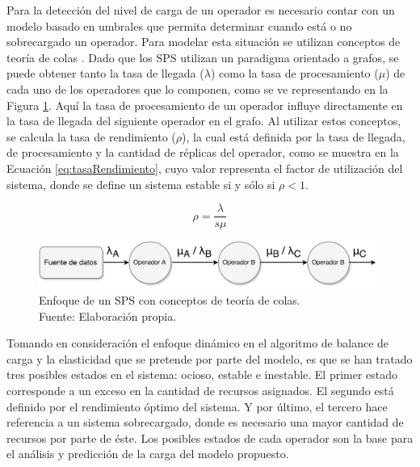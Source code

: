 Para la detecci\'on del nivel de carga de un operador es necesario contar con un modelo basado en umbrales que permita determinar cuando est\'a o no sobrecargado un operador. Para modelar esta situaci\'on se utilizan conceptos de teor\'ia de colas \citep{bose2013introduction}. Dado que los SPS utilizan un paradigma orientado a grafos, se puede obtener tanto la tasa de llegada ($\lambda$) como la tasa de procesamiento ($\mu$) de cada uno de los operadores que lo componen, como se ve representando en la Figura \ref{fig:analisisTeoriaColas}. Aqu\'i la tasa de procesamiento de un operador influye directamente en la tasa de llegada del siguiente operador en el grafo. Al utilizar estos conceptos, se calcula la tasa de rendimiento ($\rho$), la cual est\'a definida por la tasa de llegada, de procesamiento y la cantidad de r\'eplicas del operador, como se muestra en la Ecuaci\'on \ref{eq:tasaRendimiento}, cuyo valor representa el factor de utilizaci\'on del sistema, donde se define un sistema estable si y s\'olo si $\rho < 1$.

\begin{equation} \label{eq:tasaRendimiento}
	\rho = \frac{\lambda}{s \mu}
\end{equation}

\begin{figure}[!ht]
	\centering
	\includegraphics[scale=0.6]{images/AnalisisTeoriaColas.pdf}
	\caption[Enfoque de un SPS con conceptos de teor\'ia de colas.]{Enfoque de un SPS con conceptos de teor\'ia de colas.\\Fuente: Elaboraci\'on propia.}
	\label{fig:analisisTeoriaColas}
\end{figure}

Tomando en consideraci\'on el enfoque din\'amico en el algoritmo de balance de carga y la elasticidad que se pretende por parte del modelo, es que se han tratado tres posibles estados en el sistema: ocioso, estable e inestable. El primer estado corresponde a un exceso en la cantidad de recursos asignados. El segundo est\'a definido por el rendimiento \'optimo del sistema. Y por \'ultimo, el tercero hace referencia a un sistema sobrecargado, donde es necesario una mayor cantidad de recursos por parte de \'este. Los posibles estados de cada operador son la base para el an\'alisis y predicci\'on de la carga del modelo propuesto.

